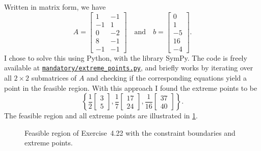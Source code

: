 \documentclass[
  a4paper,
  12pt,
]{article}
\numberwithin{equation}{section}
\begin{document}
\begin{solution}
  Written in matrix form, we have
  \begin{equation}
    A =
    \begin{bmatrix}
      1 & -1 \\
      -1 & 1 \\
      0 & -2 \\
      8 & -1 \\
      -1 & -1
    \end{bmatrix}
    \quad\text{and}\quad
    b =
    \begin{bmatrix}
      0 \\
      1 \\
      -5 \\
      16 \\
      -4
    \end{bmatrix}.
  \end{equation}
  I chose to solve this using Python, with the library SymPy.
  The code is freely available at \href{https://github.com/augustfe/MAT4120/blob/main/mandatory/extreme_points.py}{\texttt{mandatory/extreme\_points.py}}, and briefly works by iterating over all $2 \times 2$ submatrices of $A$ and checking if the corresponding equations yield a point in the feasible region.
  With this approach I found the extreme points to be
  \begin{equation}
    \left\{
      \frac{1}{2}
      \begin{bmatrix} 3 \\ 5
      \end{bmatrix},
      \frac{1}{7}
      \begin{bmatrix} 17 \\ 24
      \end{bmatrix},
      \frac{1}{16}
      \begin{bmatrix} 37 \\ 40
      \end{bmatrix}
    \right\}.
  \end{equation}
  The feasible region and all extreme points are illustrated in \cref{fig:exercise422-feasible-region}.

  \begin{figure}[h]
    \centering
    
    \caption{Feasible region of Exercise~4.22 with the constraint boundaries and extreme points.}\label{fig:exercise422-feasible-region}
  \end{figure}
\end{solution}
\end{document}
